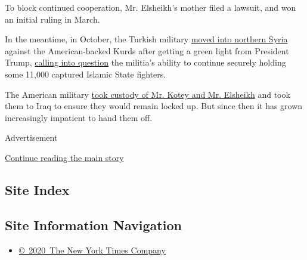 To block continued cooperation, Mr. Elsheikh's mother filed a lawsuit,
and won an initial ruling in March.

In the meantime, in October, the Turkish military
\href{https://www.nytimes3xbfgragh.onion/2019/10/09/world/middleeast/turkey-attacks-syria.html}{moved
into northern Syria} against the American-backed Kurds after getting a
green light from President Trump,
\href{https://www.nytimes3xbfgragh.onion/2019/10/07/us/politics/isis-prisons-detainees.html?}{calling
into question} the militia's ability to continue securely holding some
11,000 captured Islamic State fighters.

The American military
\href{https://www.nytimes3xbfgragh.onion/2019/10/09/us/politics/beatles-isis-us-custody.html}{took
custody of Mr. Kotey and Mr. Elsheikh} and took them to Iraq to ensure
they would remain locked up. But since then it has grown increasingly
impatient to hand them off.

Advertisement

\protect\hyperlink{after-bottom}{Continue reading the main story}

\hypertarget{site-index}{%
\subsection{Site Index}\label{site-index}}

\hypertarget{site-information-navigation}{%
\subsection{Site Information
Navigation}\label{site-information-navigation}}

\begin{itemize}
\tightlist
\item
  \href{https://help.nytimes3xbfgragh.onion/hc/en-us/articles/115014792127-Copyright-notice}{©~2020~The
  New York Times Company}
\end{itemize}

